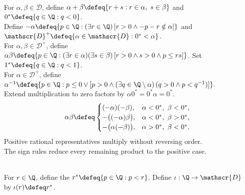 \begin{definition} \label{def:cut-arithmetic} \\
For $\alpha,\beta\in\mathscr{D}$, define $\alpha+\beta\defeq\{r+s:r\in\alpha,\ s\in\beta\}$ and $0^*\defeq\{q\in\Q:q<0\}$.\\
Define $-\alpha\defeq\{p\in\Q:(\exists r\in\Q)\,[r>0\land-p-r\notin\alpha]\}$ and $\mathscr{D}^+\defeq\{\alpha\in\mathscr{D}:0^*<\alpha\}$.\\
For $\alpha,\beta\in\mathscr{D}^+$, define $\alpha\beta\defeq\{p\in\Q:(\exists r\in\alpha)(\exists s\in\beta)\,[r>0\land s>0\land p\leq rs]\}$. Set $1^*\defeq\{q\in\Q:q<1\}$.\\
For $\alpha\in\mathscr{D}^+$, define $\alpha^{-1}\defeq\{p\in\Q:p\leq0\lor[p>0\land(\exists q\in\Q\setminus\alpha)\,(q>0\land p<q^{-1})]\}$.\\
Extend multiplication to zero factors by $\alpha0^*=0^*\alpha=0^*$.
\begin{equation*}
\alpha\beta\defeq
\begin{cases}
(-\alpha)(-\beta), & \alpha<0^*,\ \beta<0^*,\\
-\bigl((-\alpha)\beta\bigr), & \alpha<0^*,\ \beta>0^*,\\
-\bigl(\alpha(-\beta)\bigr), & \alpha>0^*,\ \beta<0^*.
\end{cases}
\end{equation*}
Positive rational representatives multiply without reversing order.\\
The sign rules reduce every remaining product to the positive case.
\end{definition}

\begin{definition} \label{def:rational-cuts} \\
For $r\in\Q$, define the  $r^*\defeq\{p\in\Q:p<r\}$. Define $\iota:\Q\to\mathscr{D}$ by $\iota(r)\defeq r^*$.
\end{definition}


